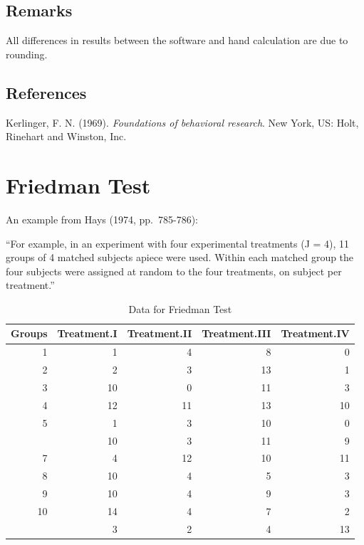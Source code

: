 \documentclass[
]{book}
\begin{document}
\hypertarget{remarks-3}{%
\subsection{Remarks}\label{remarks-3}}

All differences in results between the software and hand calculation are due to rounding.

\hypertarget{references-3}{%
\subsection{References}\label{references-3}}

Kerlinger, F. N. (1969). \emph{Foundations of behavioral research}. New York, US: Holt, Rinehart and Winston, Inc.

\hypertarget{friedman-test}{%
\section{Friedman Test}\label{friedman-test}}

An example from Hays (1974, pp.~785-786):

``For example, in an experiment with four experimental treatments (J = 4), 11 groups of 4 matched subjects apiece were used. Within each matched group the four subjects were assigned at random to the four treatments, on subject per treatment.''

\begin{table}

\caption{\label{tab:unnamed-chunk-62}Data for Friedman Test}
\centering
\begin{tabular}[t]{rrrrr}
\toprule
Groups & Treatment.I & Treatment.II & Treatment.III & Treatment.IV\\
\midrule
1 & 1 & 4 & 8 & 0\\
2 & 2 & 3 & 13 & 1\\
3 & 10 & 0 & 11 & 3\\
4 & 12 & 11 & 13 & 10\\
5 & 1 & 3 & 10 & 0\\
\addlinespace
6 & 10 & 3 & 11 & 9\\
7 & 4 & 12 & 10 & 11\\
8 & 10 & 4 & 5 & 3\\
9 & 10 & 4 & 9 & 3\\
10 & 14 & 4 & 7 & 2\\
\addlinespace
11 & 3 & 2 & 4 & 13\\
\bottomrule
\end{tabular}
\end{table}
\end{document}
